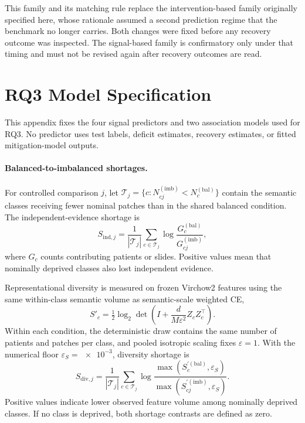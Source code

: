 \documentclass[11pt]{article}
\begin{document}
This family and its matching rule replace the intervention-based family originally specified here, whose rationale assumed a second prediction regime that the benchmark no longer carries. Both changes were fixed before any recovery outcome was inspected. The signal-based family is confirmatory only under that timing and must not be revised again after recovery outcomes are read.

\section{RQ3 Model Specification}
\label{app:rq3}
This appendix fixes the four signal predictors and two association models used for RQ3. No predictor uses test labels, deficit estimates, recovery estimates, or fitted mitigation-model outputs.

\paragraph{Balanced-to-imbalanced shortages.}
For controlled comparison $j$, let $\mathcal T_j=\{c:N^{(\mathrm{imb})}_{cj}<N^{(\mathrm{bal})}_{c}\}$ contain the semantic classes receiving fewer nominal patches than in the shared balanced condition. The independent-evidence shortage is
\begin{equation}
  S_{\mathrm{ind},j}=\frac{1}{|\mathcal T_j|}
  \sum_{c\in\mathcal T_j}
  \log\frac{G^{(\mathrm{bal})}_{c}}{G^{(\mathrm{imb})}_{cj}},
  \label{eq:rq3-independent-shortage}
\end{equation}
\noindent where $G_c$ counts contributing patients or slides. Positive values mean that nominally deprived classes also lost independent evidence.

Representational diversity is measured on frozen Virchow2 features using the same within-class semantic volume as semantic-scale weighted CE,
\begin{equation}
  S'_c=\tfrac{1}{2}\log_2\det\!\left(I+\frac{d}{M\varepsilon^2}Z_cZ_c^\top\right).
  \label{eq:rq3-semantic-volume}
\end{equation}
\noindent Within each condition, the deterministic draw contains the same number of patients and patches per class, and pooled isotropic scaling fixes $\varepsilon=1$. With the numerical floor $\varepsilon_S=\num{e-3}$, diversity shortage is
\begin{equation}
  S_{\mathrm{div},j}=\frac{1}{|\mathcal T_j|}
  \sum_{c\in\mathcal T_j}
  \log\frac{\max(S_c^{\prime(\mathrm{bal})},\varepsilon_S)}
           {\max(S_{cj}^{\prime(\mathrm{imb})},\varepsilon_S)}.
  \label{eq:rq3-diversity-shortage}
\end{equation}
\noindent Positive values indicate lower observed feature volume among nominally deprived classes. If no class is deprived, both shortage contrasts are defined as zero.
\end{document}

